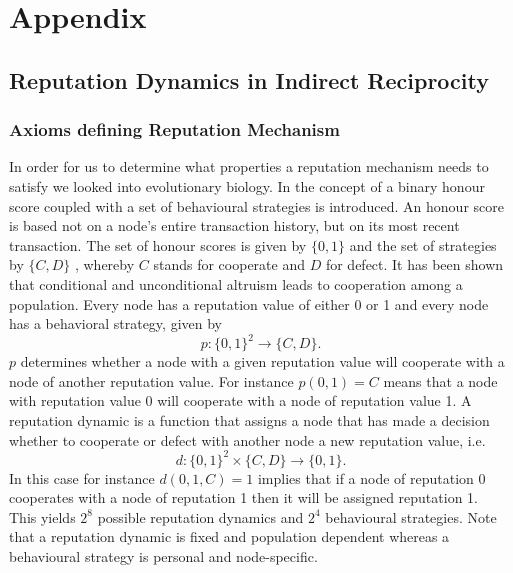 \chapter{Appendix}
\label{chap:Appendix}

\section{Reputation Dynamics in Indirect Reciprocity}
\label{sec:Reputation Dynamics in Indirect Reciprocity}

\subsection{Axioms defining Reputation Mechanism}
\label{subsec:Axioms defining Reputation Mechanism}
In order for us to determine what properties a reputation mechanism needs to satisfy we looked into evolutionary biology. In \cite{How Should we Define Goodness} the concept of a binary honour score coupled with a set of behavioural strategies is introduced. An honour score is based not on a node's entire transaction history, but on its most recent transaction. The set of honour scores is given by $\{0,1\}$ and the set of strategies by $\{C,D\}$ , whereby $C$ stands for cooperate and $D$ for defect. It has been shown that conditional and unconditional altruism leads to cooperation among a population. Every node has a reputation value of either 0 or 1 and every node has a behavioral strategy, given by 
\[
p:\{0,1\}^2\rightarrow{}\{C,D\}.
\]
$p$ determines whether a node with a given reputation value will cooperate with a node of another reputation value. For instance $p(0,1)=C$ means that a node with reputation value 0 will cooperate with a node of reputation value 1. A reputation dynamic is a function that assigns a node that has made a decision whether to cooperate or defect with another node a new reputation value, i.e.
\[
d:\{0,1\}^2\times{}\{C,D\}\rightarrow{}\{0,1\}.
\]
In this case for instance $d(0,1,C)=1$ implies that if a node of reputation 0 cooperates with a node of reputation 1 then it will be assigned reputation 1. \vspace{1em}\\
This yields $2^8$ possible reputation dynamics and $2^4$ behavioural strategies. Note that a reputation dynamic is fixed and population dependent whereas a behavioural strategy is personal and node-specific. \vspace{1em}\\

